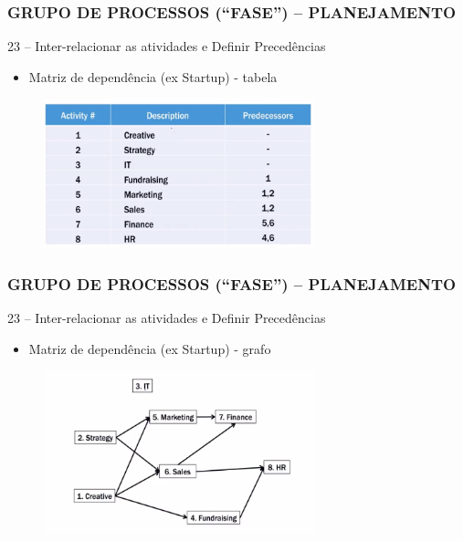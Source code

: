 \begin{frame}
 \frametitle{GRUPO DE PROCESSOS (“FASE”) – PLANEJAMENTO}
 23 – Inter-relacionar as atividades e Definir Precedências
 \begin{itemize}
  \item Matriz de dependência (ex Startup) - tabela
 \end{itemize}
  \begin{figure}
   \centering
   \includegraphics[width = 0.7\textwidth]{figs/fig21.png}
  \end{figure}
\end{frame}

\begin{frame}
 \frametitle{GRUPO DE PROCESSOS (“FASE”) – PLANEJAMENTO}
 23 – Inter-relacionar as atividades e Definir Precedências
 \begin{itemize}
  \item Matriz de dependência (ex Startup) - grafo
 \end{itemize}
  \begin{figure}
   \centering
   \includegraphics[width = 0.7\textwidth]{figs/fig22.png}
  \end{figure}
\end{frame}


